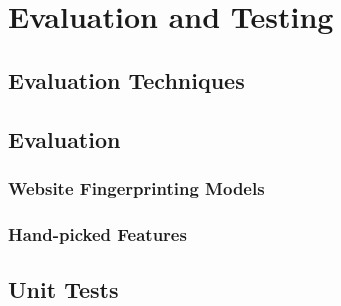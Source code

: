 \section{Evaluation and Testing}

\subsection{Evaluation Techniques}


\subsection{Evaluation}


\subsubsection{Website Fingerprinting Models}



\subsubsection{Hand-picked Features}



\subsection{Unit Tests}
